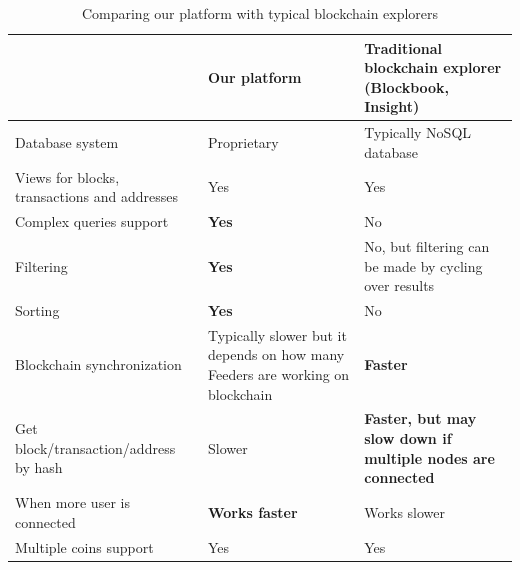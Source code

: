 \begin{table}
    \centering
    \begin{tabular}{| p{} | p{} | p{} |}
    \hline
    & \textbf{Our platform}                                                                    & \textbf{Traditional blockchain explorer (Blockbook, Insight)}      \\ \hline
    Database system               & Proprietary                                                                         & Typically NoSQL database                                                        \\ \hline
    Views for blocks, transactions and addresses               & Yes                                                                         & Yes                                                        \\ \hline
    Complex queries support               & \textbf{Yes}                                                                         & No                                                        \\ \hline
    Filtering                             & \textbf{Yes}                                                                         & No, but filtering can be made by cycling over results     \\ \hline
    Sorting                               & \textbf{Yes}                                                                         & No                                                        \\ \hline
    Blockchain synchronization            & Typically slower but it depends on how many Feeders are working on blockchain & \textbf{Faster}                                                    \\ \hline
    Get block/transaction/address by hash & Slower                                                                        & \textbf{Faster, but may slow down if multiple nodes are connected} \\ \hline
    When more user is connected           & \textbf{Works faster}                                                                  & Works slower                                              \\ \hline
    Multiple coins support                & Yes                                                                          & Yes                                                \\ \hline
    \end{tabular}
    \caption{Comparing our platform with typical blockchain explorers}
    \label{comparingTable}
\end{table}


